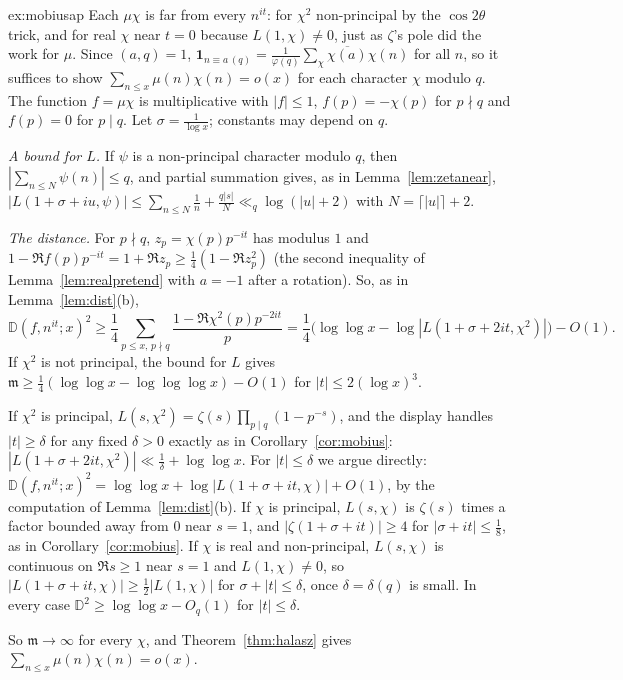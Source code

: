 \begin{solution}{ex:mobiusap}
\idea Each $\mu\chi$ is far from every $n^{it}$: for $\chi^2$ non-principal by the $\cos2\theta$ trick, and for real $\chi$ near $t=0$ because $L(1,\chi)\ne0$, just as $\zeta$'s pole did the work for $\mu$.
\writeup Since $(a,q)=1$, $\mathbf1_{n\equiv a\,(q)}=\frac1{\varphi(q)}\sum_\chi\overline{\chi(a)}\chi(n)$ for all $n$, so it suffices to show $\sum_{n\le x}\mu(n)\chi(n)=o(x)$ for each character $\chi$ modulo $q$. The function $f=\mu\chi$ is multiplicative with $|f|\le1$, $f(p)=-\chi(p)$ for $p\nmid q$ and $f(p)=0$ for $p\mid q$. Let $\sigma=\frac1{\log x}$; constants may depend on $q$.

\emph{A bound for $L$.} If $\psi$ is a non-principal character modulo $q$, then $|\sum_{n\le N}\psi(n)|\le q$, and partial summation gives, as in Lemma~\ref{lem:zetanear}, $|L(1+\sigma+iu,\psi)|\le\sum_{n\le N}\frac1n+\frac{q|s|}N\ll_q\log(|u|+2)$ with $N=\lceil|u|\rceil+2$.

\emph{The distance.} For $p\nmid q$, $z_p=\chi(p)p^{-it}$ has modulus $1$ and $1-\Re f(p)p^{-it}=1+\Re z_p\ge\frac14(1-\Re z_p^2)$ (the second inequality of Lemma~\ref{lem:realpretend} with $a=-1$ after a rotation). So, as in Lemma~\ref{lem:dist}(b),
\[
\mathbb D(f,n^{it};x)^2\ge\frac14\sum_{p\le x,\,p\nmid q}\frac{1-\Re\chi^2(p)p^{-2it}}p=\frac14\bigl(\log\log x-\log|L(1+\sigma+2it,\chi^2)|\bigr)-O(1).
\]
If $\chi^2$ is not principal, the bound for $L$ gives $\mathfrak m\ge\frac14(\log\log x-\log\log\log x)-O(1)$ for $|t|\le2(\log x)^3$.

If $\chi^2$ is principal, $L(s,\chi^2)=\zeta(s)\prod_{p\mid q}(1-p^{-s})$, and the display handles $|t|\ge\delta$ for any fixed $\delta>0$ exactly as in Corollary~\ref{cor:mobius}: $|L(1+\sigma+2it,\chi^2)|\ll\frac1\delta+\log\log x$. For $|t|\le\delta$ we argue directly: $\mathbb D(f,n^{it};x)^2=\log\log x+\log|L(1+\sigma+it,\chi)|+O(1)$, by the computation of Lemma~\ref{lem:dist}(b). If $\chi$ is principal, $L(s,\chi)$ is $\zeta(s)$ times a factor bounded away from $0$ near $s=1$, and $|\zeta(1+\sigma+it)|\ge4$ for $|\sigma+it|\le\frac18$, as in Corollary~\ref{cor:mobius}. If $\chi$ is real and non-principal, $L(s,\chi)$ is continuous on $\Re s\ge1$ near $s=1$ and $L(1,\chi)\ne0$, so $|L(1+\sigma+it,\chi)|\ge\frac12|L(1,\chi)|$ for $\sigma+|t|\le\delta$, once $\delta=\delta(q)$ is small. In every case $\mathbb D^2\ge\log\log x-O_q(1)$ for $|t|\le\delta$.

So $\mathfrak m\to\infty$ for every $\chi$, and Theorem~\ref{thm:halasz} gives $\sum_{n\le x}\mu(n)\chi(n)=o(x)$.
\end{solution}


